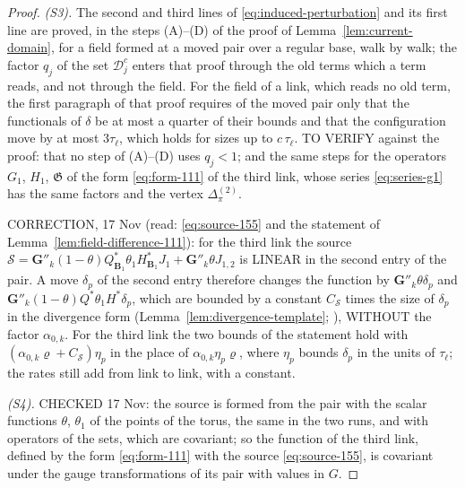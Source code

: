 \begin{proof}
\emph{(S3).} The second and third lines of \eqref{eq:induced-perturbation} and its first line are proved, in the steps (A)--(D) of the proof of Lemma~\ref{lem:current-domain}, for a field \cite[(179), (180)]{BalabanVAR} formed at a moved pair over a regular base, walk by walk; the factor $q_j$ of the set $\mathcal D^c_j$ enters that proof through the old terms which a term reads, and not through the field. For the field of a link, which reads no old term, the first paragraph of that proof requires of the moved pair only that the functionals of $\delta$ be at most a quarter of their bounds and that the configuration move by at most $3\tau_\ell$, which holds for sizes up to $c\,\tau_\ell$. TO VERIFY against the proof: that no step of (A)--(D) uses $q_j < 1$; and the same steps for the operators $G_1$, $H_1$, $\mathfrak G$ of the form \eqref{eq:form-111} of the third link, whose series \eqref{eq:series-g1} has the same factors and the vertex $\Delta^{(2)}_\pi$.

CORRECTION, 17 Nov (read: \eqref{eq:source-155} and the statement of Lemma~\ref{lem:field-difference-111}): for the third link the source $\mathscr S = \mathbf G''_k(1 - \theta)Q^*_{\mathbf B_1}\theta_1H^*_{\mathbf B_1}J_1 + \mathbf G''_k\theta J_{1,2}$ is LINEAR in the second entry of the pair. A move $\delta_p$ of the second entry therefore changes the function by $\mathbf G''_k\theta\delta_p$ and $\mathbf G''_k(1 - \theta)Q^*\theta_1H^*\delta_p$, which are bounded by a constant $C_{\mathscr S}$ times the size of $\delta_p$ in the divergence form (Lemma~\ref{lem:divergence-template}; \cite[(3.42), (3.44)]{BalabanPBG}), WITHOUT the factor $\alpha_{0,k}$. For the third link the two bounds of the statement hold with $(\alpha_{0,k}\varrho + C_{\mathscr S})\eta_p$ in the place of $\alpha_{0,k}\eta_p\varrho$, where $\eta_p$ bounds $\delta_p$ in the units of $\tau_\ell$; the rates still add from link to link, with a constant.

\emph{(S4).} CHECKED 17 Nov: the source is formed from the pair with the scalar functions $\theta$, $\theta_1$ of the points of the torus, the same in the two runs, and with operators of the sets, which are covariant; so the function of the third link, defined by the form \eqref{eq:form-111} with the source \eqref{eq:source-155}, is covariant under the gauge transformations of its pair with values in $G$.
\end{proof}


